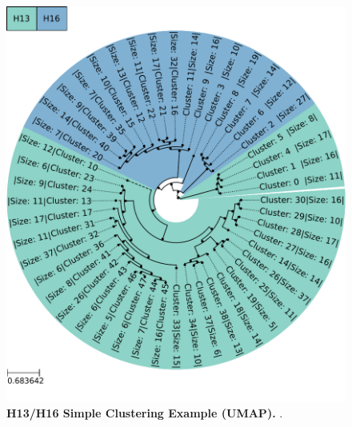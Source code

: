 \begin{figure}[!hbt]
    \centering
    \includegraphics[width=\textwidth]{UMAP/Clustertree_Segment_4_H_Simple.pdf}
    \caption[H13/H16 Simple Clustering Example (\Acrshort{UMAP})]{\textbf{H13/H16 Simple Clustering Example (\Acrshort{UMAP}).} .}
    \label{fig:Simple_Clustertree_UMAP}
\end{figure}

